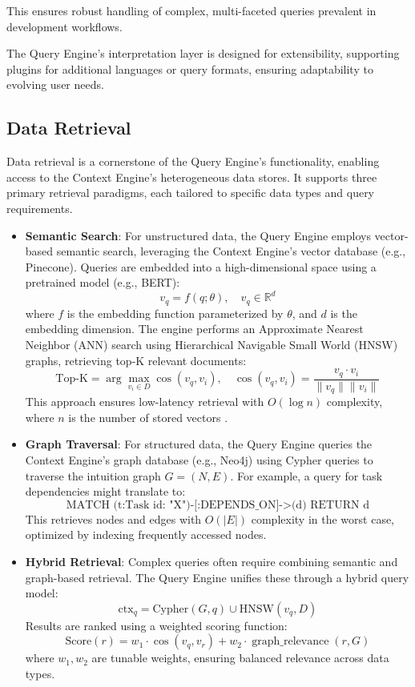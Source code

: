 \documentclass[11pt]{article}
\begin{document}
\begin{itemize}
        This ensures robust handling of complex, multi-faceted queries prevalent in development workflows.
\end{itemize}

The Query Engine’s interpretation layer is designed for extensibility, supporting plugins for additional languages or query formats, ensuring adaptability to evolving user needs.

\subsection{Data Retrieval}
\label{subsec:data_retrieval}

Data retrieval is a cornerstone of the Query Engine’s functionality, enabling access to the Context Engine’s heterogeneous data stores. It supports three primary retrieval paradigms, each tailored to specific data types and query requirements.

\begin{itemize}
    \item \textbf{Semantic Search}: For unstructured data, the Query Engine employs vector-based semantic search, leveraging the Context Engine’s vector database (e.g., Pinecone). Queries are embedded into a high-dimensional space using a pretrained model (e.g., BERT):
        \[
        v_q = f(q; \theta), \quad v_q \in \mathbb{R}^d
        \]
        where \( f \) is the embedding function parameterized by \( \theta \), and \( d \) is the embedding dimension. The engine performs an Approximate Nearest Neighbor (ANN) search using Hierarchical Navigable Small World (HNSW) graphs, retrieving top-K relevant documents:
        \[
        \text{Top-K} = \arg\max_{v_i \in D} \cos(v_q, v_i), \quad \cos(v_q, v_i) = \frac{v_q \cdot v_i}{\|v_q\| \|v_i\|}
        \]
        This approach ensures low-latency retrieval with \( O(\log n) \) complexity, where \( n \) is the number of stored vectors \cite{hnsw}.

    \item \textbf{Graph Traversal}: For structured data, the Query Engine queries the Context Engine’s graph database (e.g., Neo4j) using Cypher queries to traverse the intuition graph \( G = (N, E) \). For example, a query for task dependencies might translate to:
        \[
        \text{MATCH (t:Task {id: "X"})-[:DEPENDS\_ON]->(d) RETURN d}
        \]
        This retrieves nodes and edges with \( O(|E|) \) complexity in the worst case, optimized by indexing frequently accessed nodes.

    \item \textbf{Hybrid Retrieval}: Complex queries often require combining semantic and graph-based retrieval. The Query Engine unifies these through a hybrid query model:
        \[
        \text{ctx}_q = \text{Cypher}(G, q) \cup \text{HNSW}(v_q, D)
        \]
        Results are ranked using a weighted scoring function:
        \[
        \text{Score}(r) = w_1 \cdot \cos(v_q, v_r) + w_2 \cdot \operatorname{graph\_relevance}(r, G)
        \]
        where \( w_1, w_2 \) are tunable weights, ensuring balanced relevance across data types.
\end{itemize}
\end{document}
